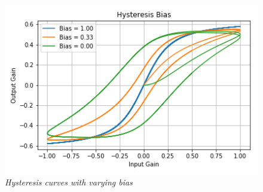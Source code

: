 \documentclass[landscape,twocolumn,a5paper]{manual}
\begin{document}
%
\begin{figure}[]
    \center
    \includegraphics[width=0.85\columnwidth]{../Simulations/Hysteresis/bias.png}
    \caption{\label{h_bias}{\it Hysteresis curves with varying bias}}
\end{figure}
\end{document}
